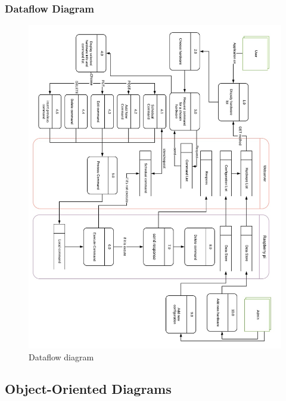 \documentclass[12pt, oneside, a4paper]{book}
\begin{document}
			
				\newpage\subsubsection{Dataflow Diagram}
				\begin{figure}[H]
					\caption{Dataflow diagram}
					\includegraphics[width=\linewidth]{img/diagram_dataflow.jpg}
				\end{figure}
				\newpage\subsection{Object-Oriented Diagrams}
\end{document}
